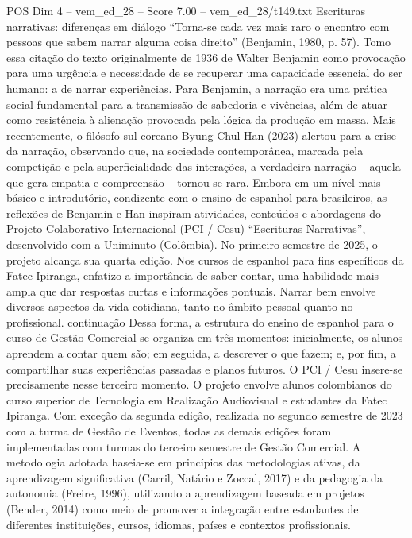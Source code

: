 \begin{textsample}{POS Dim 4 – vem\_ed\_28 – Score 7.00 – vem\_ed\_28/t149.txt}  \label{ex:f4_pos_040}
Escrituras narrativas: diferenças em diálogo “Torna-se cada vez mais raro o encontro com pessoas que sabem narrar alguma coisa direito” (Benjamin, 1980, p. 57).
Tomo essa citação do texto originalmente de 1936 de Walter Benjamin como provocação para uma urgência e necessidade de se recuperar uma capacidade essencial do ser humano: a de narrar experiências.
Para Benjamin, a narração era uma prática social fundamental para a transmissão de sabedoria e vivências, além de atuar como resistência à alienação provocada pela lógica da produção em massa.
Mais recentemente, o filósofo sul-coreano Byung-Chul Han (2023) alertou para a crise da narração, observando que, na sociedade contemporânea, marcada pela competição e pela superficialidade das interações, a verdadeira narração – aquela que gera empatia e compreensão – tornou-se rara.
Embora em um nível mais básico e introdutório, condizente com o ensino de espanhol para brasileiros, as reflexões de Benjamin e Han inspiram atividades, conteúdos e abordagens do Projeto Colaborativo Internacional (PCI / Cesu) “Escrituras Narrativas”, desenvolvido com a Uniminuto (Colômbia).
No primeiro semestre de 2025, o projeto alcança sua quarta edição.
Nos cursos de espanhol para fins específicos da Fatec Ipiranga, enfatizo a importância de saber contar, uma habilidade mais ampla que dar respostas curtas e informações pontuais.
Narrar bem envolve diversos aspectos da vida cotidiana, tanto no âmbito pessoal quanto no profissional. continuação Dessa forma, a estrutura do ensino de espanhol para o curso de Gestão Comercial se organiza em três momentos: inicialmente, os alunos aprendem a contar quem são; em seguida, a descrever o que fazem; e, por fim, a compartilhar suas experiências passadas e planos futuros.
O PCI / Cesu insere-se precisamente nesse terceiro momento.
O projeto envolve alunos colombianos do curso superior de Tecnologia em Realização Audiovisual e estudantes da Fatec Ipiranga.
Com exceção da segunda edição, realizada no segundo semestre de 2023 com a turma de Gestão de Eventos, todas as demais edições foram implementadas com turmas do terceiro semestre de Gestão Comercial.
A metodologia adotada baseia-se em princípios das metodologias ativas, da aprendizagem significativa (Carril, Natário e Zoccal, 2017) e da pedagogia da autonomia (Freire, 1996), utilizando a aprendizagem baseada em projetos (Bender, 2014) como meio de promover a integração entre estudantes de diferentes instituições, cursos, idiomas, países e contextos profissionais.

\end{textsample}
